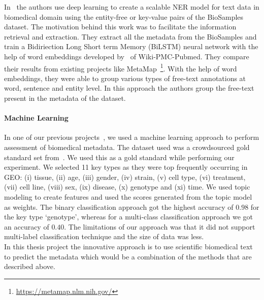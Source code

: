 In~\cite{tsui2018creating} the authors use deep learning to create a scalable NER model for text data in biomedical domain using the entity-free or key-value pairs of the BioSamples dataset. The motivation behind this work was to facilitate the information retrieval and extraction. They extract all the metadata from the BioSamples and train a Bidiriection Long Short term Memory (BiLSTM) neural network with the help of word embeddings developed by~\cite{chiu2016train} of Wiki-PMC-Pubmed. They compare their results from existing projects like MetaMap~\footnote{\url{https://metamap.nlm.nih.gov/}}. With the help of word embeddings, they were able to group various types of free-text annotations at word, sentence and entity level. In this approach the authors group the free-text present in the metadata of the dataset. 

\paragraph{Machine Learning}
In one of our previous projects~\cite{nayak2018ML}, we used a machine learning approach to perform assessment of biomedical metadata. The dataset used was a crowdsourced gold standard set from~\cite{zaveri2017metacrowd}. We used this as a gold standard while performing our experiment. We selected 11 key types as they were top frequently occurring in GEO: (i) tissue, (ii) age, (iii) gender, (iv) strain, (v) cell type, (vi) treatment, (vii) cell line, (viii) sex, (ix) disease, (x) genotype and (xi) time. We used topic modeling to create features and used the scores generated from the topic model as weights. The binary classification approach got the highest accuracy of $0.98$ for the key type `genotype', whereas for a multi-class classification approach we got an accuracy of $0.40$. The limitations of our approach was that it did not support multi-label classification technique and the size of data was less. \\ 

In this thesis project the innovative approach is to use scientific biomedical text to predict the metadata which would be a combination of the methods that are described above. 

